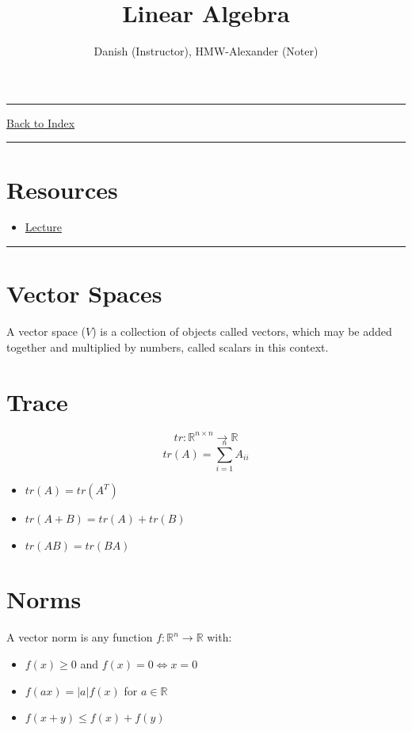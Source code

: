 \documentclass[letterpaper,10pt]{article}
\title{\textbf{Linear Algebra}}
\author{Danish (Instructor), HMW-Alexander (Noter)}
\newcommand{\panhline}{\begin{center}\rule{\textwidth}{1pt}\end{center}}
\begin{document}
\maketitle

\panhline
\href{../index.html}{Back to Index}

\panhline
\tableofcontents

\section*{Resources}

\begin{itemize}
	\item \href{../../Lectures/R2_LinearAlgebra.pdf}{Lecture}
\end{itemize}

\panhline

\section{Vector Spaces}

A vector space ($V$) is a collection of objects called vectors, which may be added together and multiplied by numbers, called scalars in this context.

\section{Trace}

$$tr: \mathbb{R}^{n\times n} \rightarrow \mathbb{R}$$
$$tr(A)=\sum_{i=1}^{n}A_{ii}$$

\begin{itemize}
	\item $tr(A)=tr(A^T)$
	\item $tr(A+B)=tr(A)+tr(B)$
	\item $tr(AB)=tr(BA)$
\end{itemize}

\section{Norms}

A vector norm is any function $f: \mathbb{R}^n \rightarrow \mathbb{R}$ with:
\begin{itemize}
	\item $f(x)\geq 0$ and $f(x)=0 \Leftrightarrow x=0$
	\item $f(ax)=|a|f(x)$ for $a\in \mathbb{R}$
	\item $f(x+y)\leq f(x)+f(y)$
\end{itemize}
\end{document}
